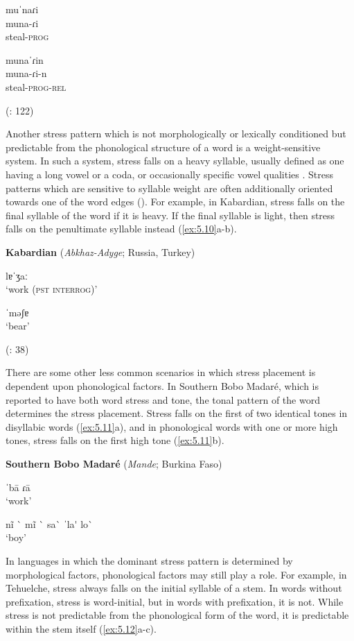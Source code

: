 \ex  muˈnaɾi\\
  muna-ɾi\\
steal-\textsc{prog}

\ex  munaˈɾin\\
  muna-ɾi-n\\
steal-\textsc{prog}-\textsc{rel}

(\citealt{VallejosYopán2010}: 122)
\z
\z

  Another stress pattern which is not morphologically or lexically conditioned but predictable from the phonological structure of a word is a weight-sensitive system. In such a system, stress falls on a heavy syllable, usually defined as one having a long vowel or a coda, or occasionally specific vowel qualities \citep{Gordon2006}. Stress patterns which are sensitive to syllable weight are often additionally oriented towards one of the word edges (\citealt{GoedemansvanderHulst2013b}). For example, in Kabardian, stress falls on the final syllable of the word if it is heavy. If the final syllable is light, then stress falls on the penultimate syllable instead (\ref{ex:5.10}a-b).

\ea\label{ex:5.10}
  \textbf{Kabardian} (\textit{Abkhaz-Adyge}; Russia, Turkey)

\ea   lɐˈʒaː\\
\glt ‘work (\textsc{pst} \textsc{interrog})’

\ex  ˈməʃɐ\\
\glt ‘bear’

(\citealt{GordonApplebaum2010}: 38)
\z
\z

  There are some other less common scenarios in which stress placement is dependent upon phonological factors. In Southern Bobo Madaré, which is reported to have both word stress and tone, the tonal pattern of the word determines the stress placement. Stress falls on the first of two identical tones in disyllabic words (\ref{ex:5.11}a), and in phonological words with one or more high tones, stress falls on the first high tone (\ref{ex:5.11}b).

\ea\label{ex:5.11}
  \textbf{Southern Bobo Madaré} (\textit{Mande}; Burkina Faso)

\ea  \textsf{ˈ}ba\textsf{\={} }ɾa\textsf{\={} }\\
\glt ‘work’

\ex  nĩ \`{} mĩ \`{} sa\`{} ˈla\'{} lo\`{} \\
\glt ‘boy’
\citep[110]{Morse1976}
\z
\z

  In languages in which the dominant stress pattern is determined by morphological factors, phonological factors may still play a role. For example, in Tehuelche, stress always falls on the initial syllable of a stem. In words without prefixation, stress is word-initial, but in words with prefixation, it is not. While stress is not predictable from the phonological form of the word, it is predictable within the stem itself (\ref{ex:5.12}a-c).


